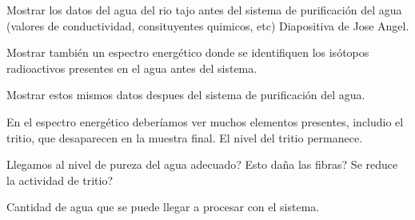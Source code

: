 Mostrar los datos del agua del rio tajo antes del sistema de purificación del agua (valores de conductividad, consituyentes quimicos, etc) Diapositiva de Jose Angel.

Mostrar también un espectro energético donde se identifiquen los isótopos radioactivos presentes en el agua antes del sistema.

Mostrar estos mismos datos despues del sistema de purificación del agua.

En el espectro energético deberíamos ver muchos elementos presentes, includio el tritio, que desaparecen en la muestra final. El nivel del tritio permanece.

Llegamos al nivel de pureza del agua adecuado? Esto daña las fibras? Se reduce la actividad de tritio? 

Cantidad de agua que se puede llegar a procesar con el sistema.